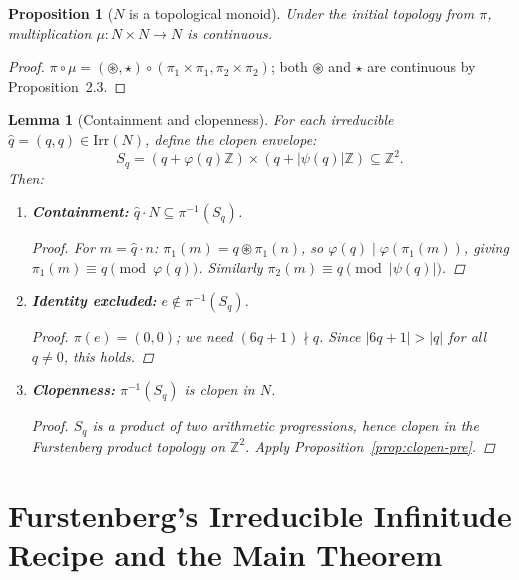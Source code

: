 \documentclass[12pt,a4paper]{amsart}
\theoremstyle{plain}
\newtheorem{lemma}[theorem]{Lemma}
\newtheorem{proposition}[theorem]{Proposition}
\theoremstyle{definition}
\theoremstyle{remark}
\newcommand{\circstar}{\mathbin{\circledast}}
\newcommand{\bstar}{\mathbin{\star}}
\newcommand{\Irr}{\mathrm{Irr}}
\newcommand{\qhat}[1]{\widehat{#1}}
\newcommand{\bbZ}{\mathbb{Z}}
\begin{document}
\begin{proposition}[$N$ is a topological monoid]
Under the initial topology from $\pi$, multiplication
$\mu\colon N \times N \to N$ is continuous.
\end{proposition}
\begin{proof}
$\pi \circ \mu = (\circstar, \bstar) \circ (\pi_1 \times \pi_1,
\pi_2 \times \pi_2)$; both $\circstar$ and $\bstar$ are continuous by
Proposition~2.3.
\end{proof}

\begin{lemma}[Containment and clopenness]
\label{lem:contain}
For each irreducible $\qhat{q} = (q,q) \in \Irr(N)$, define the
\emph{clopen envelope}:
$$S_q = (q + \varphi(q)\bbZ) \times (q + |\psi(q)|\bbZ) \subseteq \bbZ^2.$$
Then:
\begin{enumerate}[label=(\alph*)]
  \item \textbf{Containment:} $\qhat{q} \cdot N \subseteq \pi^{-1}(S_q)$.
        \begin{proof}
          For $m = \qhat{q} \cdot n$:
          $\pi_1(m) = q \circstar \pi_1(n)$, so
          $\varphi(q) \mid \varphi(\pi_1(m))$,
          giving $\pi_1(m) \equiv q \pmod{\varphi(q)}$.
          Similarly $\pi_2(m) \equiv q \pmod{|\psi(q)|}$.
        \end{proof}

  \item \textbf{Identity excluded:} $e \notin \pi^{-1}(S_q)$.
        \begin{proof}
          $\pi(e) = (0,0)$; we need $(6q+1) \nmid q$.
          Since $|6q+1| > |q|$ for all $q \neq 0$, this holds.
        \end{proof}

  \item \textbf{Clopenness:} $\pi^{-1}(S_q)$ is clopen in $N$.
        \begin{proof}
          $S_q$ is a product of two arithmetic progressions, hence
          clopen in the Furstenberg product topology on $\bbZ^2$.
          Apply Proposition~\ref{prop:clopen-pre}.
        \end{proof}
\end{enumerate}
\end{lemma}

\section{Furstenberg's Irreducible Infinitude Recipe and the Main Theorem}
\end{document}
